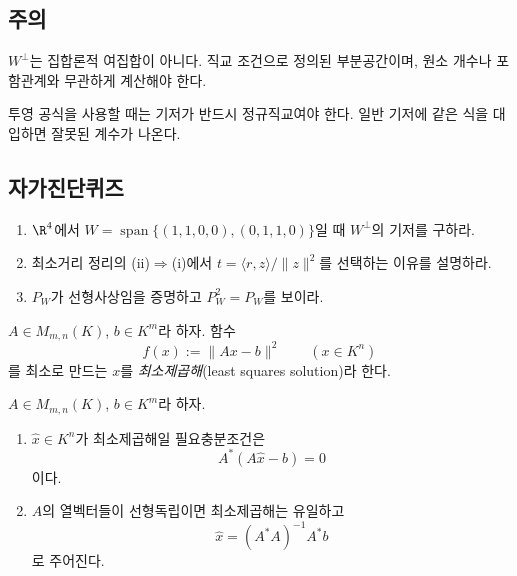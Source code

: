 \subsection*{주의}
\begin{warning}
$W^\perp$는 집합론적 여집합이 아니다. 직교 조건으로 정의된 부분공간이며, 원소 개수나 포함관계와 무관하게 계산해야 한다.
\end{warning}
\begin{warning}
투영 공식을 사용할 때는 기저가 반드시 정규직교여야 한다. 일반 기저에 같은 식을 대입하면 잘못된 계수가 나온다.
\end{warning}

\subsection*{자가진단퀴즈}
\begin{enumerate}[label=\arabic*.]
\item $\R^4$에서 $W=\operatorname{span}\{(1,1,0,0),(0,1,1,0)\}$일 때 $W^\perp$의 기저를 구하라.
\item 최소거리 정리의 (ii)$\Rightarrow$(i)에서 $t=\langle r,z\rangle/\|z\|^2$를 선택하는 이유를 설명하라.
\item $P_W$가 선형사상임을 증명하고 $P_W^2=P_W$를 보이라.
\end{enumerate}


\begin{definition}
$A\in M_{m,n}(K)$, $b\in K^m$라 하자. 함수
$$
f(x):=\|Ax-b\|^2\qquad (x\in K^n)
$$
를 최소로 만드는 $x$를 \emph{최소제곱해}(least squares solution)라 한다.
\end{definition}

\begin{theorem}[정상방정식]
$A\in M_{m,n}(K)$, $b\in K^m$라 하자.
\begin{enumerate}[label=(\roman*)]
\item $\hat x\in K^n$가 최소제곱해일 필요충분조건은
$$
A^*(A\hat x-b)=0
$$
이다.
\item $A$의 열벡터들이 선형독립이면 최소제곱해는 유일하고
$$
\hat x=(A^*A)^{-1}A^*b
$$
로 주어진다.
\end{enumerate}
\end{theorem}

